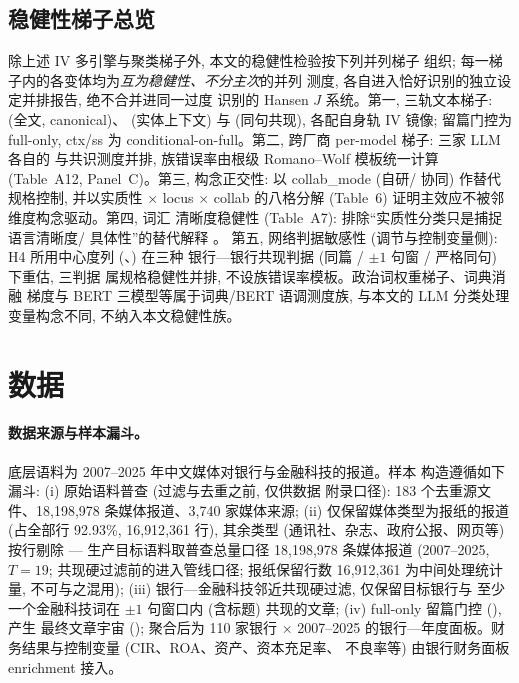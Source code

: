 \subsection{稳健性梯子总览}
除上述 IV 多引擎与聚类梯子外, 本文的稳健性检验按下列并列梯子
组织; 每一梯子内的各变体均为\emph{互为稳健性、不分主次}的并列
测度, 各自进入恰好识别的独立设定并排报告, 绝不合并进同一过度
识别的 Hansen $J$ 系统。第一, 三轨文本梯子: 
(全文, canonical)、 (实体上下文) 与
 (同句共现), 各配自身轨 IV 镜像; 留篇门控为
full-only, ctx/ss 为 conditional-on-full。第二, 跨厂商 per-model
梯子: 三家 LLM 各自的 
与共识测度并排, 族错误率由根级 Romano--Wolf 模板统一计算
(Table~A12, Panel~C)。第三, 构念正交性: 以 collab\_mode (自研/
协同) 作替代规格控制, 并以实质性 $\times$ locus $\times$ collab
的八格分解 (Table~6) 证明主效应不被邻维度构念驱动。第四, 词汇
清晰度稳健性 (Table~A7): 排除``实质性分类只是捕捉语言清晰度/
具体性''的替代解释 \parencite{loughranmcdonald2011liability}。
第五, 网络判据敏感性 (调节与控制变量侧): H4 所用中心度列
(、) 在三种
银行—银行共现判据 (同篇 / $\pm1$ 句窗 / 严格同句) 下重估, 三判据
属规格稳健性并排, 不设族错误率模板。政治词权重梯子、词典消融
梯度与 BERT 三模型等属于词典/BERT 语调测度族, 与本文的 LLM
分类处理变量构念不同, 不纳入本文稳健性族。

\section{数据}\label{sec:data}

\paragraph{数据来源与样本漏斗。}
底层语料为 2007--2025 年中文媒体对银行与金融科技的报道。样本
构造遵循如下漏斗: (i) 原始语料普查 (过滤与去重之前, 仅供数据
附录口径): 183 个去重源文件、18{,}198{,}978 条媒体报道、3{,}740
家媒体来源; (ii) 仅保留媒体类型为报纸的报道 (占全部行 92.93\%,
16{,}912{,}361 行), 其余类型 (通讯社、杂志、政府公报、网页等)
按行剔除 --- 生产目标语料取普查总量口径 18{,}198{,}978 条媒体报道
(2007--2025, $T=19$; 共现硬过滤前的进入管线口径; 报纸保留行数
16{,}912{,}361 为中间处理统计量, 不可与之混用);
(iii) 银行—金融科技邻近共现硬过滤, 仅保留目标银行与
至少一个金融科技词在 $\pm1$ 句窗口内 (含标题) 共现的文章;
(iv) full-only 留篇门控 (), 产生
最终文章宇宙 (); 聚合后为
110 家银行 $\times$ 2007--2025 的银行—年度面板。财务结果与控制变量 (CIR、ROA、资产、资本充足率、
不良率等) 由银行财务面板 enrichment 接入。

